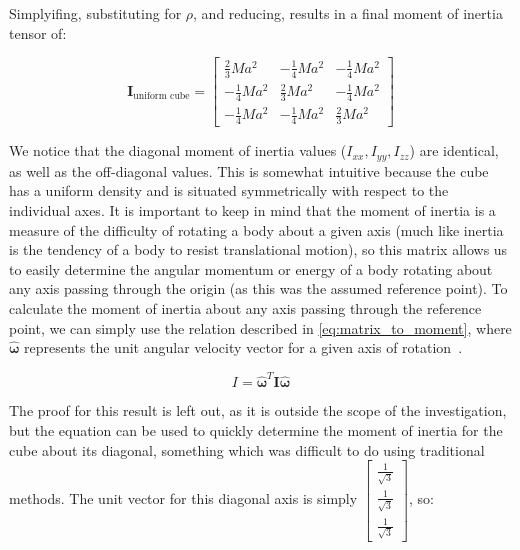 Simplyifing, substituting for $\rho$, and reducing, results in a final moment of inertia tensor of:

\[\bm{I}_{\text{uniform cube}} =  \begin{bmatrix} \frac{2}{3}Ma^2 & -\frac{1}{4}Ma^2 & -\frac{1}{4}Ma^2 \\ -\frac{1}{4}Ma^2 & \frac{2}{3}Ma^2 & -\frac{1}{4}Ma^2 \\ -\frac{1}{4}Ma^2 & -\frac{1}{4}Ma^2 & \frac{2}{3}Ma^2\end{bmatrix}\]

We notice that the diagonal moment of inertia values ($I_{xx}, I_{yy}, I_{zz}$) are identical, as well as the off-diagonal values. This is somewhat intuitive because the cube has a uniform density and is situated symmetrically with respect to the individual axes. It is important to keep in mind that the moment of inertia is a measure of the difficulty of rotating a body about a given axis (much like inertia is the tendency of a body to resist translational motion), so this matrix allows us to easily determine the angular momentum or energy of a body rotating about any axis passing through the origin (as this was the assumed reference point). To calculate the moment of inertia about any axis passing through the reference point, we can simply use the relation described in \cref{eq:matrix_to_moment}, where $\bm{\hat{\omega}}$ represents the unit angular velocity vector for a given axis of rotation~\parencite{Kreyszig_Kreyszig_Norminton_2011}. 

\begin{equation}
I = \bm{\hat{\omega}}^T\bm{I}\bm{\hat{\omega}}
\label{eq:matrix_to_moment}
\end{equation}

The proof for this result is left out, as it is outside the scope of the investigation, but the equation can be used to quickly determine the moment of inertia for the cube about its diagonal, something which was difficult to do using traditional methods. The unit vector for this diagonal axis is simply $\begin{bmatrix}\frac{1}{\sqrt{3}} \\ \frac{1}{\sqrt{3}} \\ \frac{1}{\sqrt{3}}\end{bmatrix}$, so:

